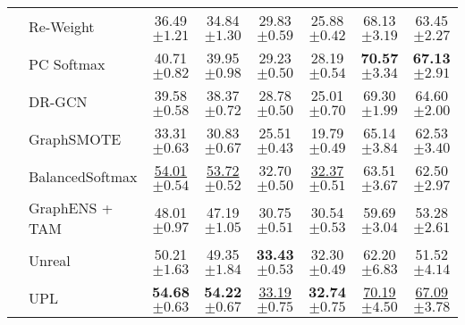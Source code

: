 \begin{table}[ht!]
\begin{center}
\begin{scriptsize}
{\begin{tabular}{@{\extracolsep{1pt}}rlcc|cc|cc@{}}
                     & Re-Weight & 36.49 \tiny{$\pm 1.21$}& 34.84 \tiny{$\pm 1.30$}
                     & 29.83 \tiny{$\pm 0.59$}& 25.88 \tiny{$\pm 0.42$}
                     & 68.13 \tiny{$\pm 3.19$}& 63.45 \tiny{$\pm 2.27$}
                     \\
                    
                     & PC Softmax & 40.71 \tiny{$\pm 0.82$}& 39.95 \tiny{$\pm 0.98$}
                     & 29.23 \tiny{$\pm 0.50$}& 28.19 \tiny{$\pm 0.54$}
                     & \textbf{70.57} \tiny{$\pm 3.34$}& \textbf{67.13} \tiny{$\pm 2.91$}
                     \\
                     
                     & DR-GCN & 39.58 \tiny{$\pm 0.58$}& 38.37 \tiny{$\pm 0.72$}
                     & 28.78 \tiny{$\pm 0.50$}& 25.01 \tiny{$\pm 0.70$}
                     & 69.30 \tiny{$\pm 1.99$}& 64.60 \tiny{$\pm 2.00$}
                  
                     \\
                     & GraphSMOTE 
                     & 33.31 \tiny{$\pm 0.63$}& 30.83 \tiny{$\pm 0.67$}
                     & 25.51 \tiny{$\pm 0.43$}& 19.79 \tiny{$\pm 0.49$}
                     & 65.14 \tiny{$\pm 3.84$}& 62.53 \tiny{$\pm 3.40$} \\
                     & BalancedSoftmax
                     & \underline{54.01} \tiny{$\pm 0.54$} & \underline{53.72} \tiny{$\pm 0.52$}
                     & 32.70 \tiny{$\pm 0.50$} & \underline{32.37} \tiny{$\pm 0.51$}
                     & 63.51 \tiny{$\pm 3.67$} & 62.50 \tiny{$\pm 2.97$} \\
                     & GraphENS + TAM
                     & 48.01 \tiny{$\pm 0.97$} & 47.19 \tiny{$\pm 1.05$}
                     & 30.75 \tiny{$\pm 0.51$} & 30.54 \tiny{$\pm 0.53$}
                     & 59.69 \tiny{$\pm 3.04$} & 53.28 \tiny{$\pm 2.61$} \\
                    & Unreal
                     & 50.21 \tiny{$\pm 1.63$} & 49.35 \tiny{$\pm 1.84$}
                     & \textbf{33.43} \tiny{$\pm 0.53$} & 32.30 \tiny{$\pm 0.49$} 
                     & 62.20 \tiny{$\pm 6.83$} & 51.52 \tiny{$\pm 4.14$}\\
                     \cline{2-8}
                     & UPL 
                     & \textbf{54.68} \tiny{$\pm 0.63$} & \textbf{54.22} \tiny{$\pm 0.67$}
                     & \underline{33.19} \tiny{$\pm 0.75$} & \textbf{32.74} \tiny{$\pm 0.75$}
                     & \underline{70.19} \tiny{$\pm 4.50$} & \underline{67.09} \tiny{$\pm 3.78$} \\

\bottomrule

\end{tabular}
}


\end{scriptsize}
\end{center}
\label{tb:apendix_hetero}
\vspace{-0.1in}
\end{table}